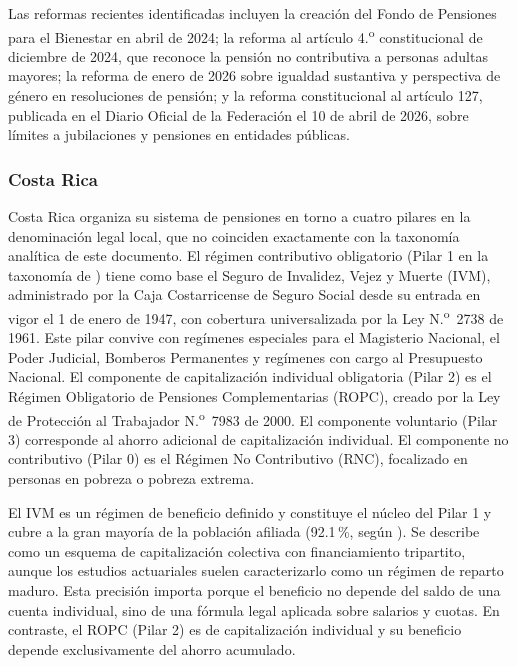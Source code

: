 \documentclass[12pt, letterpaper]{article}
\begin{document}
Las reformas recientes identificadas incluyen la creación del Fondo de Pensiones para el Bienestar en abril de 2024; la reforma al artículo 4.\textsuperscript{o} constitucional de diciembre de 2024, que reconoce la pensión no contributiva a personas adultas mayores; la reforma de enero de 2026 sobre igualdad sustantiva y perspectiva de género en resoluciones de pensión; y la reforma constitucional al artículo 127, publicada en el Diario Oficial de la Federación el 10 de abril de 2026, sobre límites a jubilaciones y pensiones en entidades públicas.

\subsubsection{Costa Rica}

Costa Rica organiza su sistema de pensiones en torno a cuatro pilares en la denominación legal local, que no coinciden exactamente con la taxonomía analítica de este documento. El régimen contributivo obligatorio (Pilar 1 en la taxonomía de \citealp{holzmann2005}) tiene como base el Seguro de Invalidez, Vejez y Muerte (IVM), administrado por la Caja Costarricense de Seguro Social desde su entrada en vigor el 1 de enero de 1947, con cobertura universalizada por la Ley N.\textsuperscript{o}~2738 de 1961. Este pilar convive con regímenes especiales para el Magisterio Nacional, el Poder Judicial, Bomberos Permanentes y regímenes con cargo al Presupuesto Nacional. El componente de capitalización individual obligatoria (Pilar 2) es el Régimen Obligatorio de Pensiones Complementarias (ROPC), creado por la Ley de Protección al Trabajador N.\textsuperscript{o}~7983 de 2000. El componente voluntario (Pilar 3) corresponde al ahorro adicional de capitalización individual. El componente no contributivo (Pilar 0) es el Régimen No Contributivo (RNC), focalizado en personas en pobreza o pobreza extrema.

El IVM es un régimen de beneficio definido y constituye el núcleo del Pilar 1 y cubre a la gran mayoría de la población afiliada (92.1\,\%, según \citealp{cepal2020}). Se describe como un esquema de capitalización colectiva con financiamiento tripartito, aunque los estudios actuariales suelen caracterizarlo como un régimen de reparto maduro. Esta precisión importa porque el beneficio no depende del saldo de una cuenta individual, sino de una fórmula legal aplicada sobre salarios y cuotas. En contraste, el ROPC (Pilar 2) es de capitalización individual y su beneficio depende exclusivamente del ahorro acumulado.
\end{document}
